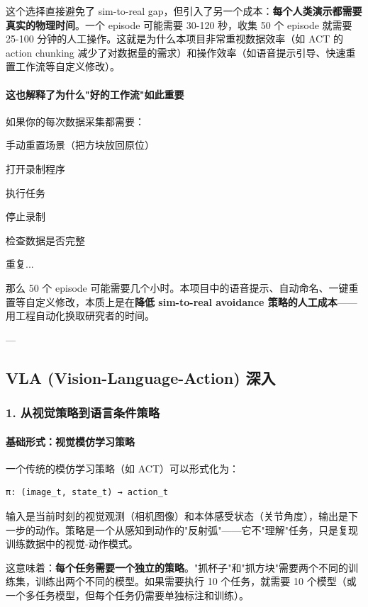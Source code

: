 \documentclass[UTF8,a4paper,11pt]{ctexart}
\begin{document}
这个选择直接避免了 sim-to-real gap，但引入了另一个成本：\textbf{每个人类演示都需要真实的物理时间}。一个 episode 可能需要 30-120 秒，收集 50 个 episode 就需要 25-100 分钟的人工操作。这就是为什么本项目非常重视数据效率（如 ACT 的 action chunking 减少了对数据量的需求）和操作效率（如语音提示引导、快速重置工作流等自定义修改）。

\paragraph{这也解释了为什么"好的工作流"如此重要}


如果你的每次数据采集都需要：
\item[1] 手动重置场景（把方块放回原位）
\item[2] 打开录制程序
\item[3] 执行任务
\item[4] 停止录制
\item[5] 检查数据是否完整
\item[6] 重复...

那么 50 个 episode 可能需要几个小时。本项目中的语音提示、自动命名、一键重置等自定义修改，本质上是在\textbf{降低 sim-to-real avoidance 策略的人工成本}——用工程自动化换取研究者的时间。

---

\subsection{VLA (Vision-Language-Action) 深入}

\subsubsection{1. 从视觉策略到语言条件策略}

\paragraph{基础形式：视觉模仿学习策略}


一个传统的模仿学习策略（如 ACT）可以形式化为：

\begin{lstlisting}[language=text]
π: (image_t, state_t) → action_t
\end{lstlisting}

输入是当前时刻的视觉观测（相机图像）和本体感受状态（关节角度），输出是下一步的动作。策略是一个从感知到动作的"反射弧"——它不"理解"任务，只是复现训练数据中的视觉-动作模式。

这意味着：\textbf{每个任务需要一个独立的策略}。"抓杯子"和"抓方块"需要两个不同的训练集，训练出两个不同的模型。如果需要执行 10 个任务，就需要 10 个模型（或一个多任务模型，但每个任务仍需要单独标注和训练）。
\end{document}
